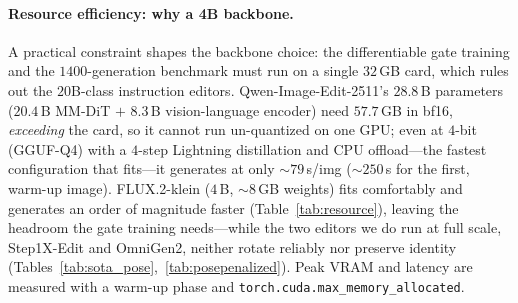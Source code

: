 \paragraph{Resource efficiency: why a 4B backbone.}
\label{sec:exp_resource}
A practical constraint shapes the backbone choice: the differentiable gate training
and the $1400$-generation benchmark must run on a single $32$\,GB card, which rules
out the $20$B-class instruction editors. Qwen-Image-Edit-2511's $28.8$\,B parameters
($20.4$\,B MM-DiT $+$ $8.3$\,B vision-language encoder) need $57.7$\,GB in bf16,
\emph{exceeding} the card, so it cannot run un-quantized on one GPU; even at $4$-bit
(GGUF-Q4) with a $4$-step Lightning distillation and CPU offload---the fastest
configuration that fits---it generates at only ${\sim}79$\,s/img (${\sim}250$\,s for
the first, warm-up image). FLUX.2-klein ($4$\,B, ${\sim}8$\,GB
weights) fits comfortably and generates an order of magnitude faster
(Table~\ref{tab:resource}), leaving the headroom the gate training needs---while
the two editors we do run at full scale, Step1X-Edit and OmniGen2, neither
rotate reliably nor preserve identity
(Tables~\ref{tab:sota_pose},~\ref{tab:posepenalized}). Peak VRAM and latency are
measured with a warm-up phase and \texttt{torch.cuda.max\_memory\_allocated}.

\begin{table}[t]\centering\small
\setlength{\tabcolsep}{5pt}
\caption[Backbone resource efficiency]{\textbf{Backbone resource efficiency.} bf16 weight footprint and
steady-state $1024^2$ generation time on one RTX~5090 ($32$\,GB).
$^\dagger$exceeds the card, so bf16 inference OOMs on a single GPU (requires
quantization or CPU offload; Step1X-Edit is run with an FP8 transformer);
$^\ddagger$GGUF-Q4 $+$ $4$-step Lightning $+$ CPU offload (the only config that
fits; bf16 and fp8 OOM). Parameter counts are measured from the released weights
(Step1X-Edit: $12.4$\,B DiT $+$ $8.3$\,B Qwen2.5-VL encoder; OmniGen2: $4.0$\,B
DiT $+$ $3.8$\,B Qwen2.5-VL MLLM). The $4$B FLUX.2-klein is an order of magnitude
faster and is the only option leaving headroom for the differentiable gate
training; the editors' s/img is from Table~\ref{tab:sota_pose}.}
\label{tab:resource}
\end{table}

